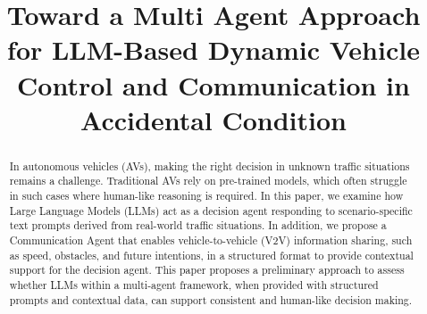 \documentclass[conference]{IEEEtran}
\begin{document}

\title{Toward a Multi Agent Approach for LLM-Based Dynamic Vehicle Control and Communication in Accidental Condition}

\author{
\and

}

\maketitle

\begin{abstract}

In autonomous vehicles (AVs), making the right decision in unknown traffic situations remains a challenge. Traditional AVs rely on pre-trained models, which often struggle in such cases where human-like reasoning is required. In this paper, we examine how Large Language Models (LLMs) act as a decision agent responding to scenario-specific text prompts derived from real-world traffic situations. In addition, we propose a Communication Agent that enables vehicle-to-vehicle (V2V) information sharing, such as speed, obstacles, and future intentions, in a structured format to provide contextual support for the decision agent. This paper proposes a preliminary approach to assess whether LLMs within a multi-agent framework, when provided with structured prompts and contextual data, can support consistent and human-like decision making.
\end{abstract}
\end{document}
